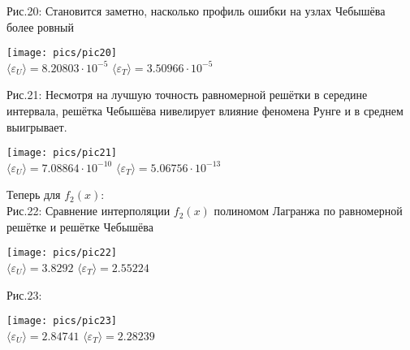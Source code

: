 \documentclass[a4paper, 14pt]{article}
\begin{document}
{\newpage
{\normalsize Рис.20: Становится заметно, насколько профиль ошибки на узлах Чебышёва более ровный}
\begin{center}
    \texttt{[image: pics/pic20]}\\
    \vspace{-0.7cm}
    {\small
        $\langle\varepsilon_U\rangle=8.20803\cdot10^{-5}$ \hspace{3cm}
        $\langle\varepsilon_T\rangle=3.50966\cdot10^{-5}$
    }
\end{center}
{\normalsize Рис.21: Несмотря на лучшую точность равномерной решётки в середине интервала, решётка Чебышёва нивелирует влияние феномена Рунге и в среднем выигрывает.}
\begin{center}
    \texttt{[image: pics/pic21]}\\
    \vspace{-0.7cm}
    {\small
        $\langle\varepsilon_U\rangle=7.08864\cdot10^{-10}$ \hspace{3cm}
        $\langle\varepsilon_T\rangle=5.06756\cdot10^{-13}$
    }
\end{center}


\newpage
Теперь для $f_2(x)$:\\[-0.5cm]
{\normalsize Рис.22: Сравнение интерполяции $f_2(x)$ полиномом Лагранжа по равномерной решётке и решётке Чебышёва}
\begin{center}
    \texttt{[image: pics/pic22]}\\
    \vspace{-0.7cm}
    {\small
        $\langle\varepsilon_U\rangle=3.8292$ \hspace{3cm}
        $\langle\varepsilon_T\rangle=2.55224$
    }
\end{center}
{\normalsize Рис.23:}
\begin{center}
    \texttt{[image: pics/pic23]}\\
    \vspace{-0.7cm}
    {\small
        $\langle\varepsilon_U\rangle=2.84741$ \hspace{3cm}
        $\langle\varepsilon_T\rangle=2.28239$
    }
\end{center}

}
\end{document}
